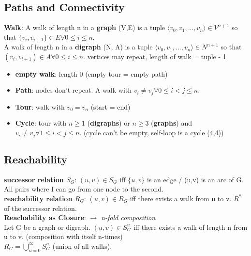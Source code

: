 \subsection*{Paths and Connectivity}
\textbf{Walk}: A walk of length n in a \textbf{graph} (V,E) is a tuple $\langle v_0, v_1, ..., v_n\rangle \in V^{n+1}$ so that $\{v_i, v_{i+1}\} \in E \forall 0 \leq i \leq n$.  \\
 A walk of length n in a \textbf{digraph} (N, A) is a tuple $\langle v_0, v_1, ..., v_n\rangle \in N^{n+1}$ so that $(v_i, v_{i+1}) \in A \forall 0 \leq i \leq n$. vertices may repeat, length of walk = tuple - 1\\ 
 \begin{itemize}[noitemsep,topsep=0pt,leftmargin=*]
    \item \textbf{empty walk}: length 0 (empty tour = empty path) 
    \item \textbf{Path}: nodes don't repeat. A walk with $v_i \neq v_j \forall 0 \leq i < j \leq n$.  
    \item \textbf{Tour}: walk with $v_0 = v_n$ (start = end)
    \item \textbf{Cycle}: tour with $n \geq 1$ (\textbf{digraphs}) or $n \geq 3$ (\textbf{graphs}) and $v_i \neq v_j \forall 1 \leq i < j \leq n$. (cycle can't be empty, self-loop is a cycle (4,4))
\end{itemize}
\subsection*{Reachability} 
\textbf{successor relation $S_G$}: $(u,v) \in S_G \text{ iff } \{u,v\}$ is an edge / (u,v) is an arc of G. All pairs where I can go from one node to the second.\\
\textbf{reachability relation $R_G$}: $(u,v) \in R_G$ iff there exists a walk from u to v. $R^*$ of the successor relation. \\
\textbf{Reachability as Closure}: \textit{$\rightarrow$ n-fold composition} \\ Let G be a graph or digraph. $(u,v) \in S_G^n$ iff there exists a walk of length n from u to v. (composition with itself n-times) \\
$R_G = \bigcup_{n = 0}^{\infty} S_G^n$ (union of all walks). \\

